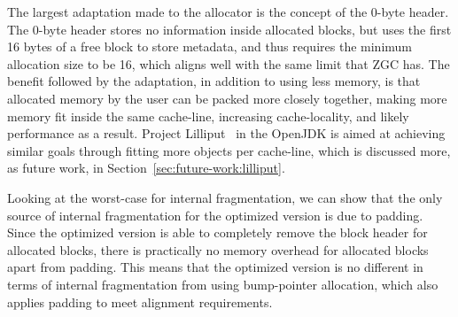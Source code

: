 
The largest adaptation made to the allocator is the concept of the 0-byte header. The 0-byte header stores no information inside allocated blocks, but uses the first 16 bytes of a free block to store metadata, and thus requires the minimum allocation size to be 16, which aligns well with the same limit that ZGC has. The benefit followed by the adaptation, in addition to using less memory, is that allocated memory by the user can be packed more closely together, making more memory fit inside the same cache-line, increasing cache-locality, and likely performance as a result. Project Lilliput~\cite{lilliput} in the OpenJDK is aimed at achieving similar goals through fitting more objects per cache-line, which is discussed more, as future work, in Section~\ref{sec:future-work:lilliput}.

Looking at the worst-case for internal fragmentation, we can show that the only source of internal fragmentation for the optimized version is due to padding. Since the optimized version is able to completely remove the block header for allocated blocks, there is practically no memory overhead for allocated blocks apart from padding. This means that the optimized version is no different in terms of internal fragmentation from using bump-pointer allocation, which also applies padding to meet alignment requirements.


